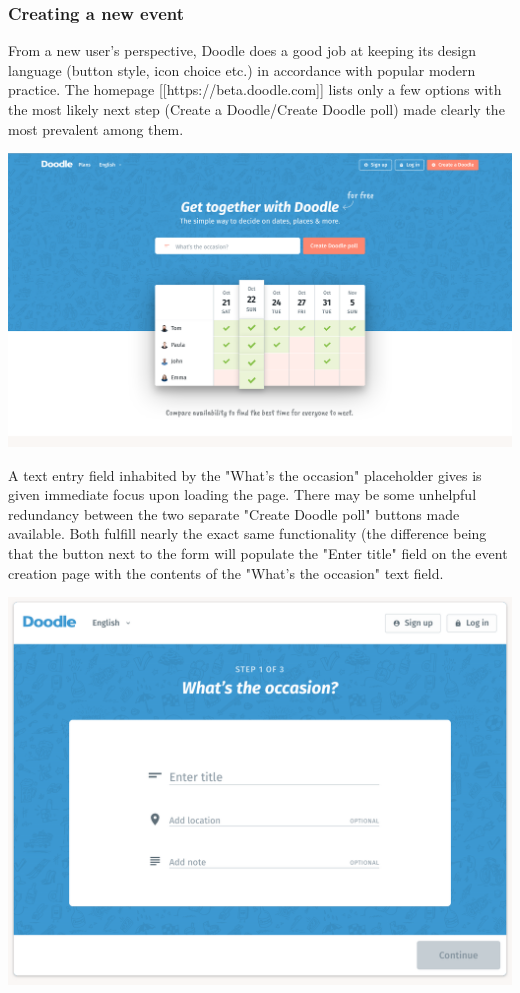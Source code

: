 \documentclass{sigchi}
\begin{document}
\subsubsection{Creating a new event}

From a new user's perspective, Doodle does a good job at keeping its
design language (button style, icon choice etc.) in accordance with
popular modern practice. The homepage [[https://beta.doodle.com]]
lists only a few options with the most likely next step (Create a
Doodle/Create Doodle poll) made clearly the most prevalent among
them.

\includegraphics[width=\columnwidth]{doodle/index.png}

A text entry field inhabited by the "What's the occasion"
placeholder gives is given immediate focus upon loading the
page. There may be some unhelpful redundancy between the two
separate "Create Doodle poll" buttons made available. Both fulfill
nearly the exact same functionality (the difference being that the
button next to the form will populate the "Enter title" field on the
event creation page with the contents of the "What's the occasion"
text field.

\includegraphics[width=\columnwidth]{doodle/create-1.png}
\end{document}
